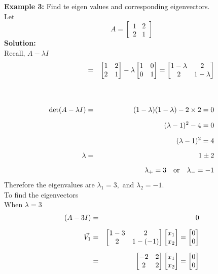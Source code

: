\documentclass[12pt]{report}
\newcommand{\bt}[1]{\textbf{#1}}
\newcommand{\sps}{\\[0.2cm]}
\newcommand{\spn}[1]{\\[#1cm]}
\newcommand{\NI}{\noindent}
\begin{document}
	\NI\bt{Example 3:} Find te eigen values and corresponding eigenvectors.\sps
	Let
	\begin{equation*}
		A = \begin{bmatrix}
			1 & 2\\
			2 & 1
		\end{bmatrix}
	\end{equation*}
	\bt{Solution:}\sps
	Recall, $A - \lambda I$\sps
	\begin{eqnarray}
		&=& \begin{bmatrix}
			1 & 2\\
			2 & 1
		\end{bmatrix} - \lambda
		\begin{bmatrix}
			1 & 0\\
			0 & 1
		\end{bmatrix} = 
		\begin{bmatrix}
			1 - \lambda & 2\\
			2 & 1 - \lambda
		\end{bmatrix}\notag\spn{1.2}
		\mathrm{det}(A-\lambda I) &=& (1-\lambda)(1-\lambda) - 2 \times 2 = 0\notag\sps
		& & (\lambda - 1)^2 - 4 = 0\notag \sps
		& & (\lambda - 1)^2 = 4\notag\sps
		\lambda &=& 1 \pm 2\notag\sps
		&& \lambda_+ = 3 \quad \mathrm{or}\quad \lambda_- = -1\notag
	\end{eqnarray}
	Therefore the eigenvalues are $\lambda_1=3,$ and $\lambda_2=-1$.\sps
	To find the eigenvectors\sps
	When $\lambda = 3$
	\begin{eqnarray}
		(A - 3I) &=& 0\notag\sps
		\vec{V_1} &=&  \begin{bmatrix}
			1-3 & 2\\
			2 & 1 - (-1)
		\end{bmatrix}
		\begin{bmatrix}
			x_1 \\
			x_2
		\end{bmatrix}
		=
		\begin{bmatrix}
			0\\
			0
		\end{bmatrix}\notag\sps
		&=& \begin{bmatrix}
			-2 & 2\\
			2 & 2
		\end{bmatrix}
		\begin{bmatrix}
			x_1 \\
			x_2
		\end{bmatrix}
		=
		\begin{bmatrix}
			0\\
			0
		\end{bmatrix}\notag
	\end{eqnarray}
	
\end{document}
